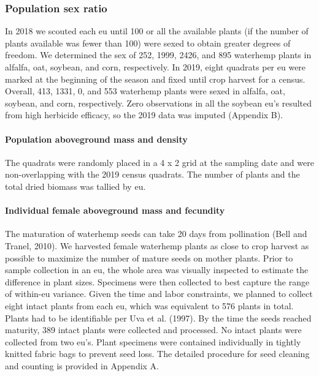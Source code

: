 \documentclass[
]{article}
\begin{document}
\hypertarget{population-sex-ratio}{%
\subsubsection*{Population sex ratio}\label{population-sex-ratio}}

In 2018 we scouted each eu until 100 or all the available plants (if the number of plants available was fewer than 100) were sexed to obtain greater degrees of freedom. We determined the sex of 252, 1999, 2426, and 895 waterhemp plants in alfalfa, oat, soybean, and corn, respectively. In 2019, eight quadrats per eu were marked at the beginning of the season and fixed until crop harvest for a census. Overall, 413, 1331, 0, and 553 waterhemp plants were sexed in alfalfa, oat, soybean, and corn, respectively. Zero observations in all the soybean eu's resulted from high herbicide efficacy, so the 2019 data was imputed (Appendix B).

\hypertarget{population-aboveground-mass-and-density}{%
\paragraph{Population aboveground mass and density}\label{population-aboveground-mass-and-density}}

The quadrats were randomly placed in a 4 x 2 grid at the sampling date and were non-overlapping with the 2019 census quadrats. The number of plants and the total dried biomass was tallied by eu.

\hypertarget{individual-female-aboveground-mass-and-fecundity}{%
\paragraph{Individual female aboveground mass and fecundity}\label{individual-female-aboveground-mass-and-fecundity}}

The maturation of waterhemp seeds can take 20 days from pollination (Bell and Tranel, 2010).
We harvested female waterhemp plants as close to crop harvest as possible to maximize the number of mature seeds on mother plants. Prior to sample collection in an eu, the whole area was visually inspected to estimate the difference in plant sizes. Specimens were then collected to best capture the range of within-eu variance.
Given the time and labor constraints, we planned to collect eight intact plants from each eu, which was equivalent to 576 plants in total. Plants had to be identifiable per Uva et al. (1997). By the time the seeds reached maturity, 389 intact plants were collected and processed. No intact plants were collected from two eu's.
Plant specimens were contained individually in tightly knitted fabric bags to prevent seed loss. The detailed procedure for seed cleaning and counting is provided in Appendix A.
\end{document}
